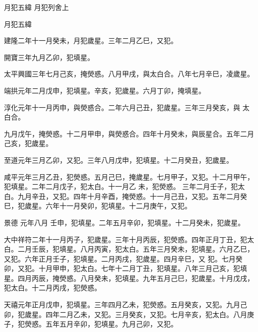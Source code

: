 
\begin{pinyinscope}

 月犯五緯
 月犯列舍上



 月犯五緯



 建隆二年十一月癸未，月犯歲星。三年二月乙巳，又犯。



 開寶三年九月乙卯，犯填星。



 太平興國三年七月己亥，掩熒惑。八月甲戌，與太白合。八年七月辛巳，凌歲星。



 端拱元年二月戊申，犯填星。辛亥，犯歲星。六月丁卯，掩填星。



 淳化元年十一月丙申，與熒惑合。二年六月己丑，犯歲星。三年三月癸亥，與
 太白合。



 九月戊午，掩熒惑。十二月甲申，與熒惑合。四年十月癸未，與辰星合。五年二月己亥，犯歲星。



 至道元年三月乙卯，又犯。三年八月戊申，犯填星。十二月癸丑，犯歲星。



 咸平元年三月乙丑，犯熒惑。五月己巳，掩歲星。七月甲子，又犯。十二月甲午，犯填星。二年二月戊子，犯太白。十一月乙
 未，犯熒惑。
 三年二月壬子，犯太白。九月辛丑，又犯。四年十月辛酉，掩熒惑。十一月己丑，又犯。五年二月癸巳，犯歲星。六年十一月癸卯，犯填星。十二月庚午，又犯。



 景德
 元年八月
 壬申，犯填星。二年五月辛卯，犯填星。十二月癸未，犯歲星。



 大中祥符二年十一月丙子，犯歲星。三年十月丙辰，犯熒惑。四年正月丁丑，犯太白。二月壬辰，犯填星。八月丙寅，犯太白。五年三月癸未，犯填星。六月乙巳，又犯。六年正月壬子，犯填星。二月丙戌，犯歲星。四月辛巳，又
 犯。七月癸卯，又犯。十月甲申，犯太白。七年十二月丁丑，犯填星。八年三月己亥，犯填星。四月丙辰，掩熒惑。八月癸未，犯填星。九年五月己巳，犯歲星。十月戊戌，犯太白。十二月丙戌，犯熒惑。



 天禧元年正月戊申，犯填星。三年四月乙未，犯熒惑。五月癸亥，又犯。九月己卯，犯歲星。四年二月乙未，又犯。三月癸亥，又犯。七月辛亥，犯太白。八月庚子，犯熒惑。五年五月辛卯，犯填星。九月己卯，又犯。




\end{pinyinscope}
